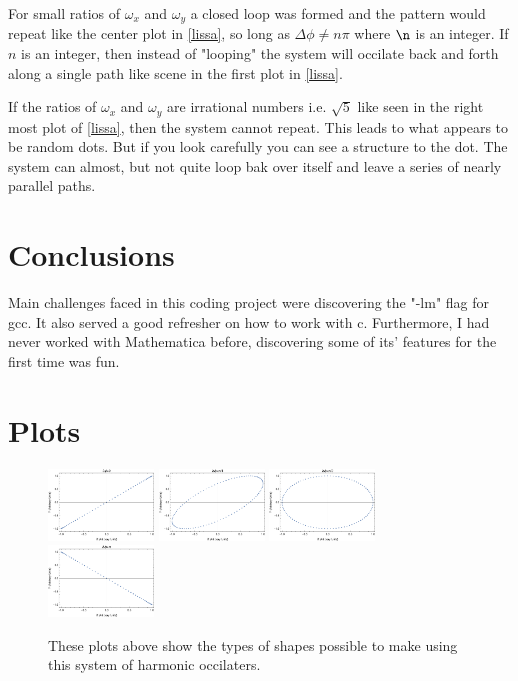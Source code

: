 \documentclass{article}
\begin{document}
\bigskip
{}
\medskip

For small ratios of \( \omega_x \) and \( \omega_y \) a closed loop was formed and the pattern would repeat like the center plot in \ref{lissa}, so long as \( \Delta\phi \neq n\pi \) where \( \n \) is an integer. If \( n \) is an integer, then instead of "looping" the system will occilate back and forth along a single path like scene in the first plot in \ref{lissa}.

\bigskip
{}
\medskip

If the ratios of \( \omega_x \) and \( \omega_{y} \) are irrational numbers i.e. \( \sqrt{5} \) like seen in the right most plot of \ref{lissa}, then the system cannot repeat. This leads to what appears to be random dots. But if you look carefully you can see a structure to the dot. The system can almost, but not quite loop bak over itself and leave a series of nearly parallel paths.

\section{Conclusions}

Main challenges faced in this coding project were discovering the "-lm" flag for gcc. It also served a good refresher on how to work with c.
Furthermore, I had never worked with Mathematica before, discovering some of its' features for the first time was fun.

\section{Plots} \label{plots}
\begin{figure}[b]
\begin{center}
\includegraphics[width=0.25\textwidth]{plot1.pdf}
\includegraphics[width=0.25\textwidth]{plot2.pdf}
\includegraphics[width=0.25\textwidth]{plot3.pdf}
\includegraphics[width=0.25\textwidth]{plot4.pdf}
\end{center}
\caption{These plots above show the types of shapes possible to make using this system of harmonic occilaters.}
\end{figure}
\end{document}
